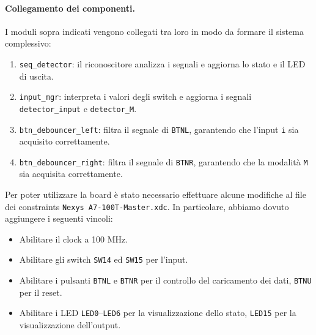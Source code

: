 \paragraph{Collegamento dei componenti.}
I moduli sopra indicati vengono collegati tra loro in modo da formare il sistema complessivo:
\begin{enumerate}
    \item \texttt{seq\_detector}: il riconoscitore analizza i segnali e aggiorna lo stato e il LED di uscita.
    \item \texttt{input\_mgr}: interpreta i valori degli switch e aggiorna i segnali \texttt{detector\_input} e \texttt{detector\_M}.
    \item \texttt{btn\_debouncer\_left}: filtra il segnale di \texttt{BTNL}, garantendo che l'input \texttt{i} sia acquisito correttamente.
    \item \texttt{btn\_debouncer\_right}: filtra il segnale di \texttt{BTNR}, garantendo che la modalità \texttt{M} sia acquisita correttamente.
\end{enumerate}

Per poter utilizzare la board è stato necessario effettuare alcune modifiche al file dei constraints \texttt{Nexys A7-100T-Master.xdc}. In particolare, abbiamo dovuto aggiungere i seguenti vincoli:
\begin{itemize}
    \item Abilitare il clock a 100 MHz.
    \item Abilitare gli switch \texttt{SW14} ed \texttt{SW15} per l’input.
    \item Abilitare i pulsanti \texttt{BTNL} e \texttt{BTNR} per il controllo del caricamento dei dati, \texttt{BTNU} per il reset.
    \item Abilitare i LED \texttt{LED0}--\texttt{LED6} per la visualizzazione dello stato, \texttt{LED15} per la visualizzazione dell’output.
\end{itemize}
